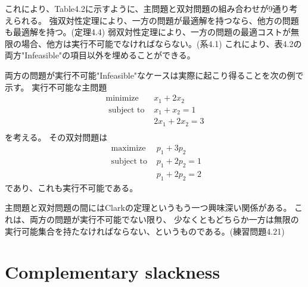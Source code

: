 \documentclass{jsarticle}
\begin{document}
これにより、Table4.2に示すように、主問題と双対問題の組み合わせが9通り考えられる。
強双対性定理により、一方の問題が最適解を持つなら、他方の問題も最適解を持つ。(定理4.4)
弱双対性定理により、一方の問題の最適コストが無限の場合、他方は実行不可能でなければならない。(系4.1)
これにより、表4.2の両方"Infeasible"の項目以外を埋めることができる。

両方の問題が実行不可能"Infeasible"なケースは実際に起こり得ることを次の例で示す。
実行不可能な主問題
\begin{equation}
  \begin{array}{cc}
  \operatorname{minimize} & x_{1}+2 x_{2} \\
  \text { subject to } & x_{1}+x_{2}=1 \\
  & 2 x_{1}+2 x_{2}=3 \\
  \end{array}
\end{equation}
を考える。
その双対問題は
\begin{equation}
  \begin{array}{cc}
  \text { maximize } & p_{1}+3 p_{2} \\
  \text { subject to } & p_{1}+2 p_{2}=1 \\
  & p_{1}+2 p_{2}=2
  \end{array}
  \end{equation}
であり、これも実行不可能である。

主問題と双対問題の間にはClarkの定理というもう一つ興味深い関係がある。
これは、両方の問題が実行不可能でない限り、
少なくともどちらか一方は無限の実行可能集合を持たなければならない、というものである。(練習問題4.21)

\newpage

\section*{Complementary slackness}
\end{document}
